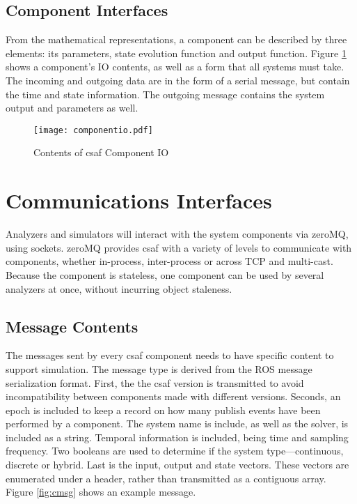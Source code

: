 \subsection{Component Interfaces}

From the mathematical representations, a component can be described by three elements: its parameters, 
state evolution function and output function. Figure \ref{fig:cio} shows a component's IO contents, as well as 
a form that all systems must take. The incoming and outgoing data are in the form of a serial message, but 
contain the time and state information. The outgoing message contains the system output and parameters as 
well.

\begin{figure}
\centering
\texttt{[image: componentio.pdf]}
\caption{Contents of \acrshort{csaf}  Component IO}
\label{fig:cio}
\end{figure}

\section{Communications Interfaces}

Analyzers and simulators will interact with the system components via zeroMQ, using sockets. zeroMQ 
provides \acrshort{csaf}  with a variety of levels to communicate with components, whether in-process, 
inter-process or across TCP and multi-cast. Because the component is stateless, one component can be 
used by several analyzers at once, without incurring object staleness.

\subsection{Message Contents}

The messages sent by every \acrshort{csaf}  component needs to have specific content to support 
simulation. The message type is derived from the ROS message serialization format. First, the the 
\acrshort{csaf}  version is transmitted to avoid incompatibility between components made with different 
versions. Seconds, an epoch is included to keep a record on how many publish events have been performed 
by a component. The system name is include, as well as the solver, is included as a string. Temporal 
information is included, being time and sampling frequency. Two booleans are used to determine if the 
system type---continuous, discrete or hybrid. Last is the input, output and state vectors. These vectors are 
enumerated under a header, rather than transmitted as a contiguous array. Figure \ref{fig:cmsg} shows an 
example message.

